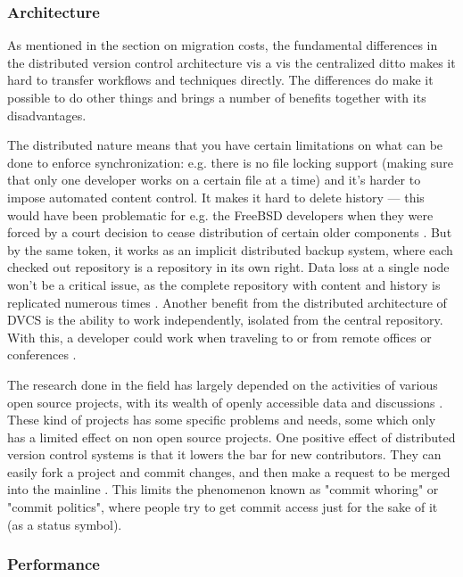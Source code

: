 \documentclass{llncs}
\begin{document}
\subsubsection{Architecture}

As mentioned in the section on migration costs, the fundamental
differences in the distributed version control architecture vis a vis 
the centralized ditto makes it hard to transfer workflows and
techniques directly. The differences do make it possible to do other
things and brings a number of benefits together with its disadvantages.

The distributed nature means that you have certain limitations on what
can be done to enforce synchronization: e.g. there is no file locking
support (making sure that only one developer works on a certain file
at a time) \cite{osullivan09} and it's harder to impose automated
content control. It makes it hard to delete history --- this would
have been problematic for e.g. the FreeBSD developers when they were
forced by a court decision to cease distribution of certain older
components \cite{alwis09}. But by the same token, it works as an
implicit distributed backup system, where each checked out repository
is a repository in its own right. Data loss at a single node won't be
a critical issue, as the complete repository with content and history
is replicated numerous times \cite{alwis09}. Another benefit from the
distributed architecture of DVCS is the ability to work independently,
isolated from the central repository. With this, a developer could
work when traveling to or from remote offices or conferences
 \cite{alwis09}\cite{robert06}.

The research done in the field has largely depended on the activities
of various open source projects, with its wealth of openly accessible
data and discussions \cite{alwis09}\cite{bird09}. These kind of
projects has some specific problems and needs, some which only has a
limited effect on non open source projects. One positive effect of
distributed version control systems is that it lowers the bar for new
contributors. They can easily fork a project and commit changes, and
then make a request to be merged into the mainline \cite{alwis09}.
This limits the phenomenon known as "commit whoring" or "commit
politics", where people try to get commit access just for the sake of
it (as a status symbol).

\subsubsection{Performance}
\end{document}
